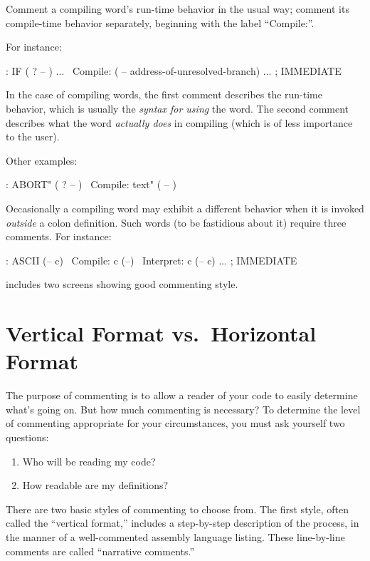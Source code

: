 \begin{tip}
Comment a compiling word's run-time behavior in the usual way; comment
its compile-time behavior separately, beginning with the label ``Compile:''.
\end{tip}
For instance:
\begin{Code}
: IF   ( ? -- ) ...
\ Compile:   ( -- address-of-unresolved-branch)
   ... ; IMMEDIATE
\end{Code}
In the case of compiling words, the first comment describes the run-time
behavior, which is usually the \emph{syntax for using} the word.  The second comment
describes what the word \emph{actually does} in compiling (which is of less
importance to the user).

Other examples:
\begin{Code}
: ABORT"  ( ? -- )
\ Compile:    text"   ( -- )
\end{Code}
Occasionally a compiling word may exhibit a different behavior when it
is invoked \emph{outside} a colon definition.  Such words (to be
fastidious about it) require three comments.  For instance:
\begin{Code}
: ASCII  (-- c)
\ Compile:   c   (--)
\ Interpret:   c   (-- c)
     ... ; IMMEDIATE
\end{Code}
 includes two screens showing good commenting style.

\section{Vertical Format vs.\ Horizontal Format}
The purpose of commenting is to allow a reader of your code to easily
determine what's going on.  But how much commenting is necessary? To
determine the level of commenting appropriate for your circumstances,
you must ask yourself two questions:
\begin{enumerate}
\item Who will be reading my code?
\item How readable are my definitions?
\end{enumerate}
There are two basic styles of commenting to choose from.  The first style,
often called the ``vertical format,'' includes a step-by-step description of
the process, in the manner of a well-commented assembly language
listing.  These line-by-line comments are called ``narrative comments.''

